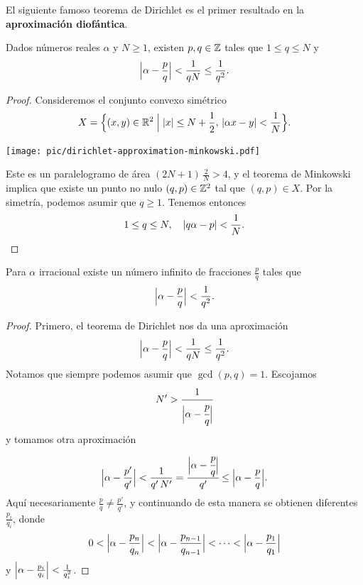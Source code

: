 El siguiente famoso teorema de Dirichlet es el primer resultado en la
\textbf{aproximación diofántica}.

\begin{teorema}
  Dados números reales $\alpha$ y $N \ge 1$, existen $p,q \in \mathbb{Z}$ tales que
  $1 \le q \le N$ y
  $$\Bigl|\alpha - \frac{p}{q}\Bigr| < \frac{1}{qN} \le \frac{1}{q^2}.$$

  \begin{proof}
    Consideremos el conjunto convexo simétrico
    $$X = \Bigl\{ (x,y) \in \mathbb{R}^2 \Bigm| |x| \le N + \frac{1}{2}, \, |\alpha x - y| < \frac{1}{N} \Bigr\}.$$

    \begin{center}
      \texttt{[image: pic/dirichlet-approximation-minkowski.pdf]}
    \end{center}

    Este es un paralelogramo de área $(2N + 1)\,\frac{2}{N} > 4$, y el teorema
    de Minkowski implica que existe un punto no nulo $(q,p) \in \mathbb{Z}^2$ tal que
    $(q,p) \in X$. Por la simetría, podemos asumir que $q \ge 1$. Tenemos
    entonces
    \[ 1 \le q \le N, \quad |q \alpha - p| < \frac{1}{N}. \qedhere \]
  \end{proof}
\end{teorema}

\begin{corolario}
  \label{cor:aproximaciones-racionales}
  Para $\alpha$ irracional existe un número infinito de fracciones $\frac{p}{q}$
  tales que
  $$\Bigl|\alpha - \frac{p}{q}\Bigr| < \frac{1}{q^2}.$$

  \begin{proof}
    Primero, el teorema de Dirichlet nos da una aproximación
    $$\Bigl|\alpha - \frac{p}{q}\Bigr| < \frac{1}{q N} \le \frac{1}{q^2}.$$
    Notamos que siempre podemos asumir que $\gcd (p,q) = 1$. Escojamos
    $$N' > \cfrac{1}{\Bigl|\alpha - \cfrac{p}{q}\Bigr|}$$
    y tomamos otra aproximación
    $$\Bigl|\alpha - \frac{p'}{q'}\Bigr| < \frac{1}{q'\,N'} = \cfrac{\Bigl|\alpha - \cfrac{p}{q}\Bigr|}{q'} \le \Bigl|\alpha - \frac{p}{q}\Bigr|.$$
    Aquí necesariamente $\frac{p}{q} \ne \frac{p'}{q'}$, y continuando de esta
    manera se obtienen diferentes $\frac{p_i}{q_i}$, donde
    $$0 < \Bigl|\alpha - \frac{p_n}{q_n}\Bigr| < \Bigl|\alpha - \frac{p_{n-1}}{q_{n-1}}\Bigr| < \cdots < \Bigl|\alpha - \frac{p_1}{q_1}\Bigr|$$
    y $\Bigl|\alpha - \frac{p_i}{q_i}\Bigr| < \frac{1}{q_i^2}$.
  \end{proof}
\end{corolario}

